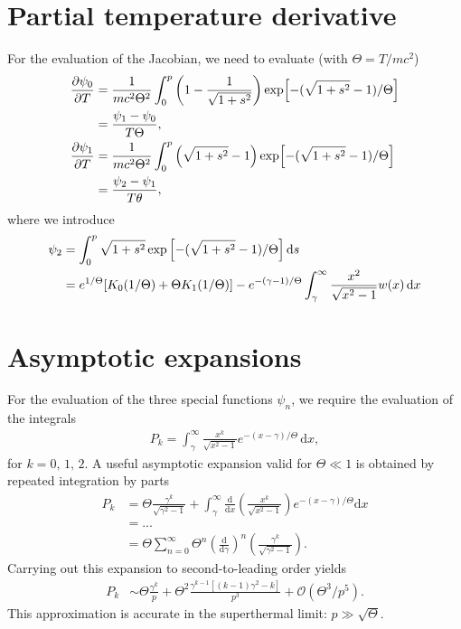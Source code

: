 \documentclass[11pt,a4paper]{article}
\newcommand{\rd}{\ensuremath{\mathrm{d}}}
\newcommand{\Ordo}{\ensuremath{\mathcal{O}}}%
\begin{document}
\section{Partial temperature derivative}
For the evaluation of the Jacobian, we need to evaluate (with $\Theta = T/mc^2$)
\begin{align}
\frac{\partial \psi_0}{\partial T} &= \frac{1}{mc^2\Theta^2}\int_0^p \left(1-\frac{1}{\sqrt{1+s^2}}\right) \exp\Bigl[-(\sqrt{1+s^2}-1)/\Theta\Bigr] \nonumber \\
&= \frac{\psi_1 - \psi_0}{T\Theta}, \\
\frac{\partial \psi_1}{\partial T} &= \frac{1}{mc^2\Theta^2}\int_0^p \left(\sqrt{1+s^2}-1\right) \exp\Bigl[-(\sqrt{1+s^2}-1)/\Theta\Bigr]  \nonumber \\
&= \frac{\psi_2 - \psi_1}{T\theta},
\end{align}
where we introduce 
\begin{align}
\psi_2 &= \int_0^p \sqrt{1+s^2} \exp{\Bigl[-(\sqrt{1+s^2}-1)/\Theta\Bigr]} \, \rd s \nonumber \\
&= e^{1/\Theta}[K_0(1/\Theta) + \Theta K_1(1/\Theta)] - e^{-(\gamma-1)/\Theta}\int_\gamma^\infty \frac{x^2}{\sqrt{x^2-1}}w(x)\,\rd x
\end{align}

\section{Asymptotic expansions}
For the evaluation of the three special functions $\psi_n$, we require the evaluation of the integrals
\begin{align}
P_k = \int_{\gamma}^\infty \frac{x^k}{\sqrt{x^2-1}}e^{-(x-\gamma)/\Theta}\,\rd x,
\end{align}
for $k=0,\,1,\,2$. A useful asymptotic expansion valid for $\Theta \ll 1$ is obtained by repeated integration by parts
\begin{align}
P_k &= \Theta \frac{\gamma^k}{\sqrt{\gamma^2-1}} + \int_\gamma^\infty \frac{\rd}{\rd x}\left(\frac{x^k}{\sqrt{x^2-1}}\right)e^{-(x-\gamma)/\Theta} \rd x \nonumber \\
&= ... \nonumber \\
&= \Theta \sum_{n=0}^\infty \Theta^n  \left(\frac{\rd}{\rd \gamma}\right)^n\left(\frac{\gamma^k}{\sqrt{\gamma^2-1}}\right). 
\end{align}
Carrying out this expansion to second-to-leading order yields
\begin{align}
P_k &\sim \Theta \frac{\gamma^k}{p} + \Theta^2 \frac{\gamma^{k-1}[(k-1)\gamma^2 - k]}{p^3} + \Ordo(\Theta^3/p^5).
\end{align}
This approximation is accurate in the superthermal limit: $p \gg \sqrt{\Theta}$.
\end{document}
